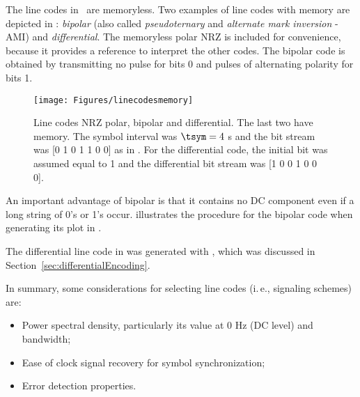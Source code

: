 The line codes in~ are memoryless. Two examples of line codes with memory are depicted in : \emph{bipolar} (also called \emph{pseudoternary} and \emph{alternate mark inversion} - AMI) and \emph{differential}. The memoryless polar NRZ is included for convenience, because it provides a reference to interpret the other codes. The bipolar code is obtained by transmitting no pulse for bits 0 and pulses of alternating polarity for bits 1. 

\begin{figure}[htbp]
\centering
\texttt{[image: Figures/linecodesmemory]}
\caption[{Line codes NRZ polar, bipolar and differential.}]{Line codes NRZ polar, bipolar and differential. The last two have memory. The symbol interval was $\tsym=4$ s and the bit stream was [0 1 0 1 1 0 0] as in . For the differential code, the initial bit was assumed equal to 1 and the differential bit stream was  [1 0 0 1 0 0 0].\label{fig:linecodesmemory}}
\end{figure}

An important advantage of bipolar is that it contains no DC component even if a long string of 0's or 1's occur.   illustrates the procedure for the bipolar code when generating its plot in .%
{}

The differential line code in  was generated with 
, which was discussed in Section~\ref{sec:differentialEncoding}.

In summary, some considerations for selecting line codes (i.\,e., signaling schemes) are:
\begin{itemize}
\item Power spectral density, particularly its value at 0 Hz (DC level) and bandwidth;
\item Ease of clock signal recovery for symbol synchronization;
\item Error detection properties.
\end{itemize}

